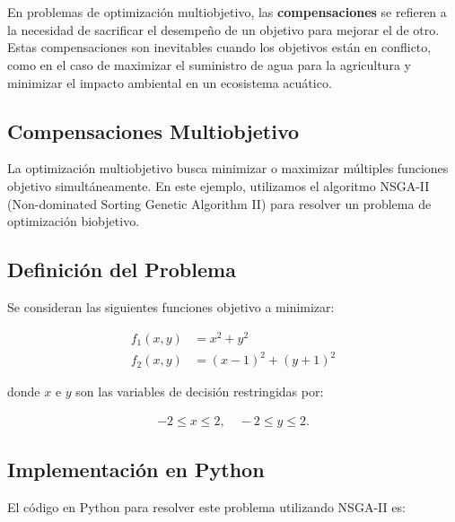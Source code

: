 \documentclass[12pt]{article}
\begin{document}
\section*{}
En problemas de optimización multiobjetivo, las \textbf{compensaciones} se refieren a la necesidad de sacrificar el desempeño de un objetivo para mejorar el de otro. Estas compensaciones son inevitables cuando los objetivos están en conflicto, como en el caso de maximizar el suministro de agua para la agricultura y minimizar el impacto ambiental en un ecosistema acuático.

\subsection*{Compensaciones Multiobjetivo}

La optimización multiobjetivo busca minimizar o maximizar múltiples funciones objetivo simultáneamente. En este ejemplo, utilizamos el algoritmo NSGA-II (Non-dominated Sorting Genetic Algorithm II) para resolver un problema de optimización biobjetivo.

\subsection*{Definición del Problema}

Se consideran las siguientes funciones objetivo a minimizar:

\begin{align}
    f_1(x, y) &= x^2 + y^2 \\
    f_2(x, y) &= (x - 1)^2 + (y + 1)^2
\end{align}

donde $x$ e $y$ son las variables de decisión restringidas por:

\begin{align}
    -2 \leq x \leq 2, \quad -2 \leq y \leq 2.
\end{align}

\subsection*{Implementación en Python}

El código en Python para resolver este problema utilizando NSGA-II es:
\end{document}
